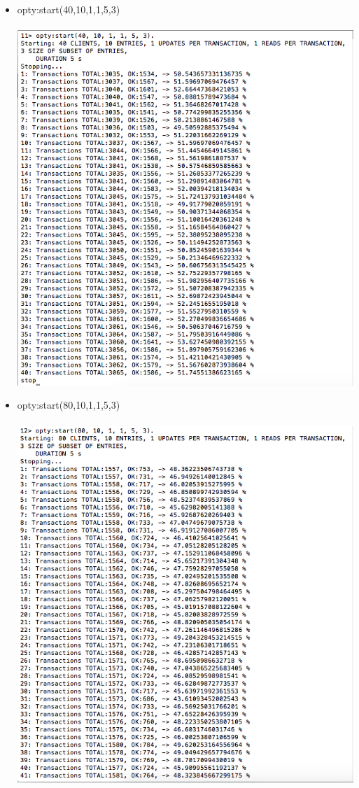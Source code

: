 \documentclass[a4paper, 11pt]{article}
\begin{document}
\begin{itemize}
\item opty:start(40,10,1,1,5,3)\\\\
\includegraphics[scale=0.5]{images/exp-i-5.png} \\
\item opty:start(80,10,1,1,5,3)\\\\
\includegraphics[scale=0.4]{images/exp-i-6a.png} \\

\end{itemize}
\end{document}
